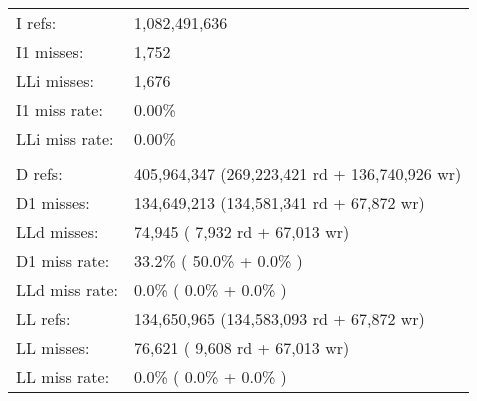 \documentclass[a4paper]{article}
\begin{document}
\begin{tabular}{ ll }

I   refs:      & 1,082,491,636 \\
I1  misses:   &          1,752  \\
LLi misses:    &         1,676 \\
I1  miss rate:   &        0.00\% \\
LLi miss rate:   &        0.00\% \\
 & \\
D   refs:       &  405,964,347  (269,223,421 rd   + 136,740,926 wr) \\
D1  misses:    &   134,649,213  (134,581,341 rd   +      67,872 wr) \\
LLd misses:   &         74,945  (      7,932 rd   +      67,013 wr) \\
D1  miss rate:    &       33.2\% (       50.0\%     +         0.0\%  ) \\
LLd miss rate:   &         0.0\% (        0.0\%     +         0.0\%  ) \\
LL refs:      &    134,650,965  (134,583,093 rd   +      67,872 wr) \\
LL misses:     &        76,621  (      9,608 rd   +      67,013 wr) \\
LL miss rate:     &        0.0\% (        0.0\%     +         0.0\%  ) \\

\end{tabular} 
\linebreak 
\linebreak
\end{document}
